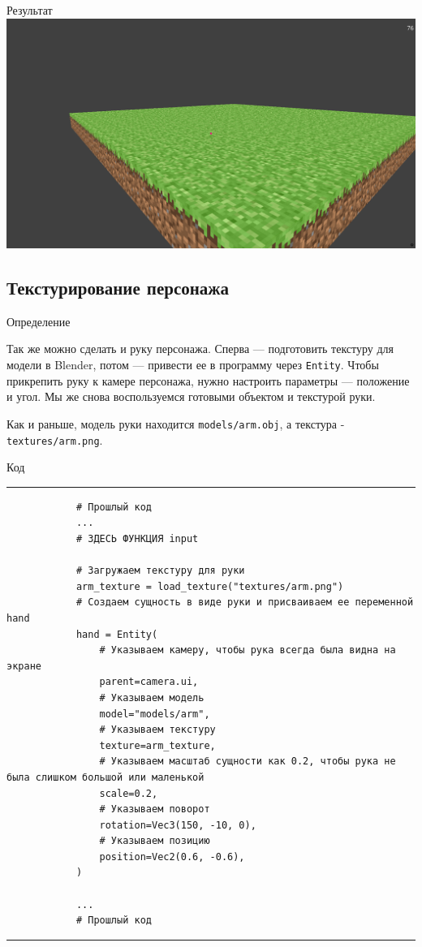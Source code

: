 \documentclass[handout]{beamer}
\begin{document}
    \begin{frame}{Результат}
        \includegraphics[width=\textwidth]{img/4.png}
    \end{frame}


    \subsection{Текстурирование персонажа}
    \begin{frame}{Определение}
        \begin{justify}
            Так же можно сделать и руку персонажа. Сперва — подготовить текстуру для модели в Blender, потом — привести ее в программу через \texttt{Entity}. Чтобы прикрепить руку к камере персонажа, нужно настроить параметры — положение и угол.
            Мы же снова воспользуемся готовыми объектом и текстурой руки.
        
            Как и раньше, модель руки находится \texttt{models/arm.obj}, а текстура - \texttt{textures/arm.png}.
        \end{justify}
    \end{frame}

    \begin{frame}[fragile]{Код}
        \scriptsize
        \rule{\textwidth}{1pt}
        \begin{verbatim}
            # Прошлый код
            ...
            # ЗДЕСЬ ФУНКЦИЯ input
            
            # Загружаем текстуру для руки
            arm_texture = load_texture("textures/arm.png")
            # Создаем сущность в виде руки и присваиваем ее переменной hand
            hand = Entity(
            	# Указываем камеру, чтобы рука всегда была видна на экране
            	parent=camera.ui,
            	# Указываем модель
            	model="models/arm",
            	# Указываем текстуру
            	texture=arm_texture,
            	# Указываем масштаб сущности как 0.2, чтобы рука не была слишком большой или маленькой
            	scale=0.2,
            	# Указываем поворот
            	rotation=Vec3(150, -10, 0),
            	# Указываем позицию
            	position=Vec2(0.6, -0.6),
            )
            
            ...
            # Прошлый код
        \end{verbatim}
        \rule{\textwidth}{1pt}
    \end{frame}
    
\end{document}
